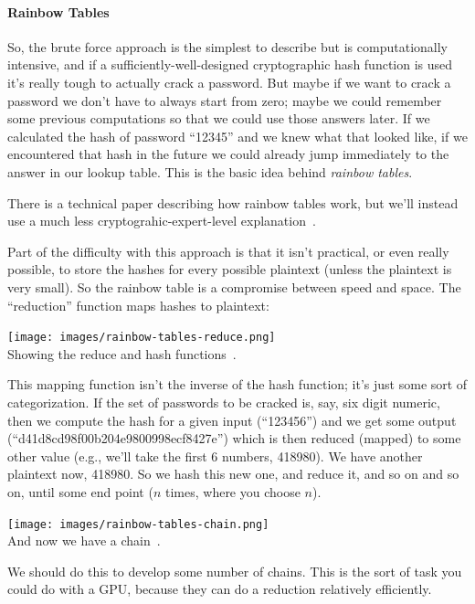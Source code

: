 \documentclass[a4paper]{report}
\begin{document}
\paragraph{Rainbow Tables} So, the brute force approach is the simplest to describe but is computationally intensive, and if a sufficiently-well-designed cryptographic hash function is used it's really tough to actually crack a password. But maybe if we want to crack a password we don't have to always start from zero; maybe we could remember some previous computations so that we could use those answers later. If we calculated the hash of password ``12345'' and we knew what that looked like, if we encountered that hash in the future we could already jump immediately to the answer in our lookup table. This is the basic idea behind \textit{rainbow tables}.

There is a technical paper describing how rainbow tables work, but we'll instead use a much less cryptograhic-expert-level explanation~\cite{rainbowtables}. 

Part of the difficulty with this approach is that it isn't practical, or even really possible, to store the hashes for every possible plaintext (unless the plaintext is very small). So the rainbow table is a compromise between speed and space. The ``reduction'' function maps hashes to plaintext:

\begin{center}
	\texttt{[image: images/rainbow-tables-reduce.png]}\\
	Showing the reduce and hash functions~\cite{rainbowtables}.
\end{center}

This mapping function isn't the inverse of the hash function; it's just some sort of categorization. If the set of passwords to be cracked is, say, six digit numeric, then we compute the hash for a given input (``123456'') and we get some output (``d41d8cd98f00b204e9800998ecf8427e'') which is then reduced (mapped) to some other value (e.g., we'll take the first 6 numbers, 418980). We have another plaintext now, 418980. So we hash this new one, and reduce it, and so on and so on, until some end point ($n$ times, where you choose $n$). 

\begin{center}
	\texttt{[image: images/rainbow-tables-chain.png]}\\
	And now we have a chain~\cite{rainbowtables}.
\end{center}

We should do this to develop some number of chains. This is the sort of task you could do with a GPU, because they can do a reduction relatively efficiently. 
\end{document}
